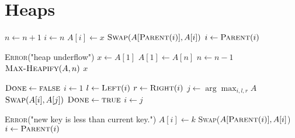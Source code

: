 \documentclass[10pt, letterpaper]{article}
\newcommand{\argmax}{\arg\!\max}
\begin{document}
\section{Heaps}
\begin{minipage}{\linewidth}
  \begin{algorithm}[H]
    \begin{algorithmic}[1]
        \State $n \gets n + 1$
        \State $i \gets n$
        \State $A[i] \gets x$
          \State $\textsc{Swap}(A[\textsc{Parent}(i)], A[i])$
          \State $i \gets \textsc{Parent}(i)$
        \EndWhile
      \EndProcedure
    \end{algorithmic}
  \end{algorithm}
\end{minipage}
\begin{minipage}{\linewidth}
  \begin{algorithm}[H]
    \begin{algorithmic}[1]
          \State \textsc{Error}("heap underflow")
        \EndIf
        \State $x \gets A[1]$
        \State $A[1] \gets A[n]$
        \State $n \gets n - 1$
        \State $\textsc{Max-Heapify}(A, n)$ 
        \State \Return $x$
      \EndProcedure
    \end{algorithmic}
  \end{algorithm}
\end{minipage}
\begin{minipage}{\linewidth}
  \begin{algorithm}[H]
    \begin{algorithmic}[1]
        \State $\textsc{Done} \gets \textsc{false}$
        \State $i \gets 1$
        \Repeat
          \State $l \gets \textsc{Left}(i)$
          \State $r \gets \textsc{Right}(i)$
          \State $j \gets \argmax_{i,l,r} A$
            \State $\textsc{Swap}(A[i], A[j])$
          \Else
            \State $\textsc{Done} \gets \textsc{true}$
          \EndIf
          \State $i \gets j$
      \EndProcedure
    \end{algorithmic}
  \end{algorithm}
\end{minipage}
\begin{minipage}{\linewidth}
  \begin{algorithm}[H]
    \begin{algorithmic}[1]
          \State \textsc{Error}("new key is less than current key.")
        \EndIf
        \State $A[i] \gets k$
          \State \textsc{Swap}($A[\textsc{Parent}(i)], A[i]$)
          \State $i \gets \textsc{Parent}(i)$
        \EndWhile
      \EndProcedure
    \end{algorithmic}
  \end{algorithm}
\end{minipage}
\end{document}
